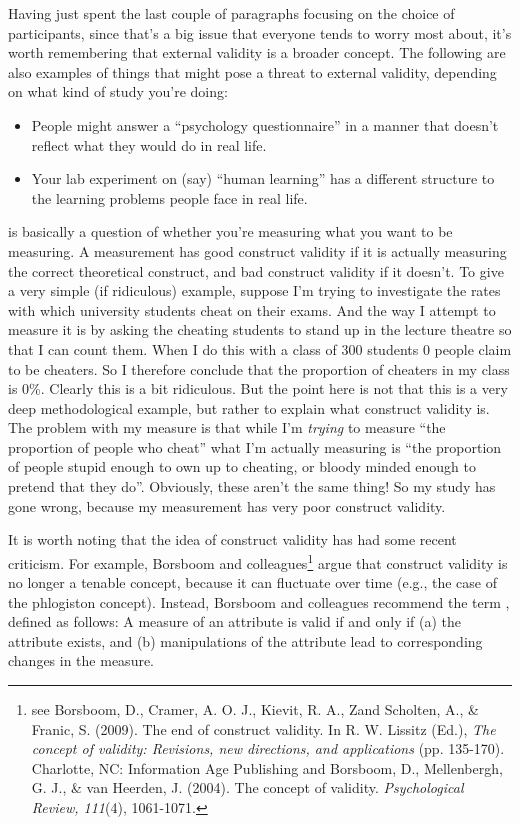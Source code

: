 Having just spent the last couple of paragraphs focusing on the choice of participants, since that's a big issue that everyone tends to worry most about, it's worth remembering that external validity is a broader concept. The following are also examples of things that might pose a threat to external validity, depending on what kind of study you're doing:
\begin{itemize}
\item People might answer a ``psychology questionnaire'' in a manner that doesn't reflect what they would do in real life.
\item Your lab experiment on (say) ``human learning'' has a different structure to the learning problems people face in real life.
\end{itemize}



 is basically a question of whether you're measuring what you want to be measuring.  A measurement has good construct validity if it is actually measuring the correct theoretical construct, and bad construct validity if it doesn't.  To give a very simple (if ridiculous) example, suppose I'm trying to investigate the rates with which university students cheat on their exams. And the way I attempt to measure it is by asking the cheating students to stand up in the lecture theatre so that I can count them. When I do this with a class of 300 students 0 people claim to be cheaters. So I therefore conclude that the proportion of cheaters in my class is 0\%. Clearly this is a bit ridiculous. But the point here is not that this is a very deep methodological example, but rather to explain what construct validity is. The problem with my measure is that while I'm {\it trying} to measure ``the proportion of people who cheat'' what I'm actually measuring is ``the proportion of people stupid enough to own up to cheating, or bloody minded enough to pretend that they do''. Obviously, these aren't the same thing! So my study has gone wrong, because my measurement has very poor construct validity.

It is worth noting that the idea of construct validity has had some recent criticism. For example, Borsboom and colleagues\footnote{see Borsboom, D., Cramer, A. O. J., Kievit, R. A., Zand Scholten, A., \& Franic, S. (2009). The end of construct validity. In R. W. Lissitz (Ed.), {\it The concept of validity: Revisions, new directions, and applications} (pp. 135-170). Charlotte, NC: Information Age Publishing and Borsboom, D., Mellenbergh, G. J., \& van Heerden, J. (2004). The concept of validity. {\it Psychological Review, 111}(4), 1061-1071.} argue that construct validity is no longer a tenable concept, because it can fluctuate over time (e.g., the case of the phlogiston concept). Instead, Borsboom and colleagues recommend the term , defined as follows: A measure of an attribute is valid if and only if (a) the attribute exists, and (b) manipulations of the attribute lead to corresponding changes in the measure.

